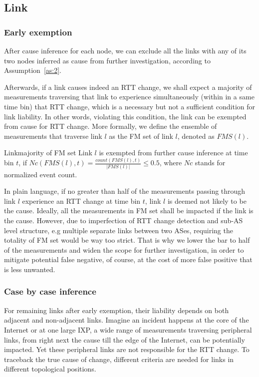 \subsection{Link}

\subsubsection{Early exemption}

After cause inference for each node, we can exclude all the links with any of its two nodes inferred as cause from further investigation, according to Assumption~\ref{as:2}.

Afterwards, if a link causes indeed an RTT change, we shall expect a majority of measurements traversing that link to experience simultaneously (within in a same time bin) that RTT change, which is a necessary but not a sufficient condition for link liability. In other words, violating this condition, the link can be exempted from cause for RTT change.
More formally, we define the ensemble of measurements that traverse link $l$ as the \acf{FM} set of link $l$, denoted as $FMS(l)$. 

\begin{heuristic}{Link}{majority of \ac{FM} set}\label{hu:link}
Link $l$ is exempted from further cause inference at time bin $t$, if $Nc(FMS(l), t) = \frac{count(FMS(l), t)}{|FMS(l)|} \leq 0.5$, where $Nc$ stands for normalized event count.
\end{heuristic}

In plain language, if no greater than half of the measurements passing through link $l$ experience an RTT change at time bin $t$, link $l$ is deemed not likely to be the cause. 
Ideally, all the measurements in \ac{FM} set shall be impacted if the link is the cause. However, due to imperfection of RTT change detection and sub-AS level structure, e.g multiple separate links between two ASes, requiring the totality of \ac{FM} set would be way too strict. That is why we lower the bar to half of the measurements and widen the scope for further investigation, in order to mitigate potential false negative, of course, at the cost of more false positive that is less unwanted.

\subsubsection{Case by case inference}

For remaining links after early exemption, their liability depends on both adjacent and non-adjacent links. Imagine an incident happens at the core of the Internet or at one large IXP, a wide range of measurements traversing peripheral links, from right next the cause till the edge of the Internet, can be potentially impacted. Yet these peripheral links are not responsible for the RTT change. 
To traceback the true cause of change, different criteria are needed for links in different topological positions.

